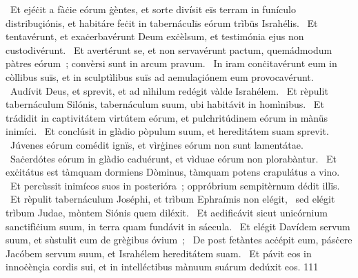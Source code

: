 {~Et ejéċit a fàċie eórum ġèntes, et sorte divísit eïs terram in funículo distribuçiónis, et habitáre feċit in tabernáculïs eórum trìbüs Israhélis.
~Et tentavérunt, et exaċerbavérunt Deum exċèlsum, et testimónia ejus non custodivérunt.
~Et avertérunt se, et non servavérunt pactum, quemádmodum pàtres eórum~; convèrsi sunt in arcum pravum.
~In iram conċitavérunt eum in còllibus suïs, et in sculptìlibus suïs ad aemulaçiónem eum provocavérunt.
~Audívit Deus, et sprevit, et ad nìhilum redégit vàlde Israhélem.
~Et rèpulit tabernáculum Silónis, tabernáculum suum, ubi habitávit in homìnibus.
~Et trádidit in captivitátem virtútem eórum, et pulchritúdinem eórum in mànüs inimíci.
~Et conclúsit in glàdio pòpulum suum, et hereditátem suam sprevit.
~Júvenes eórum comédit ignïs, et vìrġines eórum non sunt lamentátae.
~Saċerdótes eórum in glàdio caduérunt, et vìduae eórum non plorabàntur.
~Et exċitátus est tàmquam dormiens Dòminus, tàmquam potens crapulátus a vino.
~Et percùssit inimícos suos in posterióra~; oppróbrium sempitèrnum dédit illïs.
~Et rèpulit tabernáculum Joséphi, et trìbum Ephraímis non elégit,
~sed elégit trìbum Judae, mòntem Siónis quem diléxit.
~Et aedificávit sicut unicórnium sanctifìċium suum, in terra quam fundávit in sáecula.
~Et elégit Davídem servum suum, et sùstulit eum de grèġibus óvium~;
~De post fetàntes acċépit eum, pásċere Jacóbem servum suum, et Israhélem hereditátem suam.
~Et pávit eos in innoċènçia cordis sui, et in intelléctibus mànuum suárum dedúxit eos.}
{11}{1}
